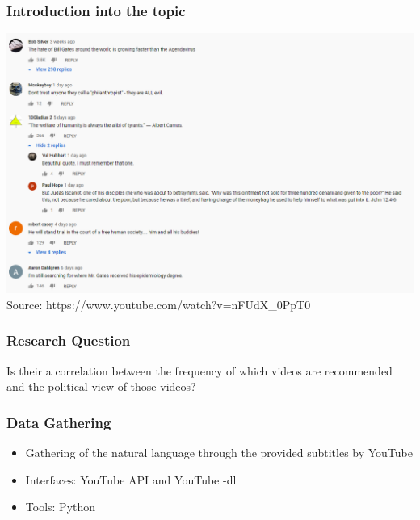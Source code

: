 \documentclass{beamer}
\begin{document}
\begin{frame}
\frametitle{Introduction into the topic}
\includegraphics[height=0.7\textheight]{BillGatesResponds}
Source: https://www.youtube.com/watch?v=nFUdX\_0PpT0
\end{frame}	
\begin{frame}
\frametitle{Research Question}
\begin{center}
Is their a correlation between the frequency of which videos are recommended and the political  view of those videos? 
\end{center}

\end{frame}	


\begin{frame}
\frametitle{Data Gathering}

\begin{itemize}
	\item Gathering of the natural language through the provided subtitles by YouTube
	\item Interfaces: YouTube API and YouTube -dl
	\item Tools: Python 
	
\end{itemize}
\end{frame}	
\end{document}
